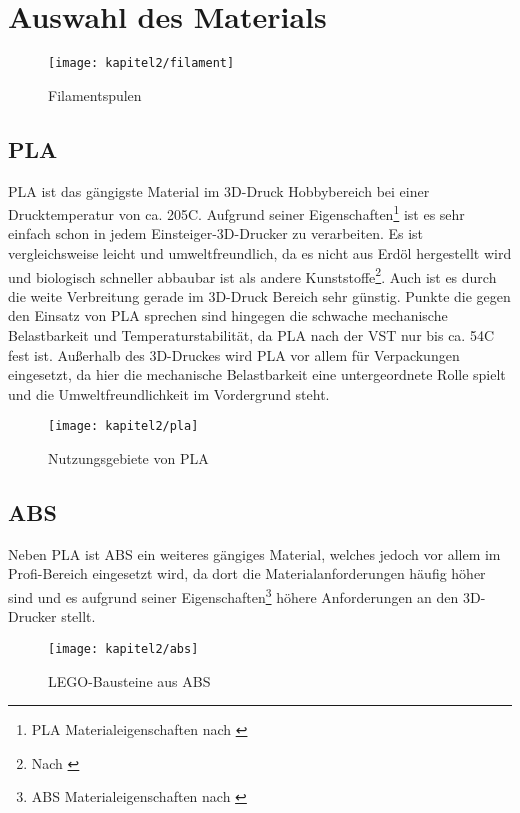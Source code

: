 \chapter{Auswahl des Materials}

\begin{figure}[h]
  \centering
  \texttt{[image: kapitel2/filament]}
  \caption{Filamentspulen}
  \label{Kap2:Filament}
\end{figure}

\section{PLA}
\ac{PLA} ist das gängigste Material im 3D-Druck Hobbybereich bei einer Drucktemperatur von ca. 205\degree C. Aufgrund seiner Eigenschaften\footnote{PLA Materialeigenschaften nach \cite{ulPLA}} ist es sehr einfach schon in jedem Einsteiger-3D-Drucker zu verarbeiten. Es ist vergleichsweise leicht und umweltfreundlich, da es nicht aus Erdöl hergestellt wird und biologisch schneller abbaubar ist als andere Kunststoffe\footnote{Nach \cite{10093722}}. Auch ist es durch die weite Verbreitung gerade im 3D-Druck Bereich sehr günstig.
Punkte die gegen den Einsatz von \ac{PLA} sprechen sind hingegen die schwache mechanische Belastbarkeit und Temperaturstabilität, da \ac{PLA} nach der \ac{VST} nur bis ca. 54\degree C fest ist. Außerhalb des 3D-Druckes wird \ac{PLA} vor allem für Verpackungen eingesetzt, da hier die mechanische Belastbarkeit eine untergeordnete Rolle spielt und die Umweltfreundlichkeit im Vordergrund steht.

\begin{figure}[h]
  \centering
  \texttt{[image: kapitel2/pla]}
  \caption{Nutzungsgebiete von PLA}
  \label{Kap2:PLAEinsatz}
\end{figure}

\section{ABS}
Neben \ac{PLA} ist \ac{ABS} ein weiteres gängiges Material, welches jedoch vor allem im Profi-Bereich eingesetzt wird, da dort die Materialanforderungen häufig höher sind und es aufgrund seiner Eigenschaften\footnote{ABS Materialeigenschaften nach \cite{ulABS}} höhere Anforderungen an den 3D-Drucker stellt.

\begin{figure}[h]
  \centering
  \texttt{[image: kapitel2/abs]}
  \caption{LEGO-Bausteine aus ABS}
  \label{Kap2:ABSLego}
\end{figure}